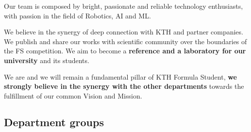 \documentclass[graybox]{svmult}
\begin{document}
Our team is composed by bright, passionate and reliable technology enthusiasts, with passion in the field of Robotics, AI and ML.

We believe in the synergy of deep connection with KTH and partner companies. We publish and share our works with scientific community over the boundaries of the FS competition. We aim to become a \textbf{reference and a laboratory for our university} and its students.

We are and we will remain a fundamental pillar of KTH Formula Student, \textbf{we strongly believe in the synergy with the other departments} towards the fulfillment of our common Vision and Mission. 

\subsection{Department groups}
\end{document}
